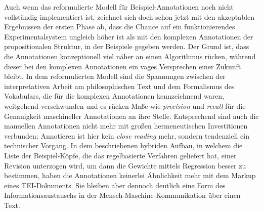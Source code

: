\documentclass{article}
\newcommand*{\englisch}[1]{\foreignlanguage{english}{\textit{#1}}}%
\begin{document}
Auch wenn das reformulierte Modell für Beispiel-Annotationen noch
nicht vollständig implementiert ist, zeichnet sich doch schon jetzt
mit den akzeptablen Ergebnissen der ersten Phase ab, dass die Chance
auf ein funktionierendes Experimentalsystem ungleich höher ist als mit
den komplexen Annotationen der propositionalen Struktur, in der
Beispiele gegeben werden. Der Grund ist, dass die Annotationen
konzeptionell viel näher an einen Algorithmus rücken, während dieser
bei den komplexen Annotationen ein vages Versprechen einer Zukunft
bleibt. In dem reformulierten Modell sind die Spannungen zwischen der
interpretativen Arbeit am philosophischen Text und dem Formalismus des
Vokabulars, die für die komplexen Annotationen kennzeichnend waren,
weitgehend verschwunden und es rücken Maße wie \englisch{precision}
und \englisch{recall} für die Genauigkeit maschineller Annotationen an
ihre Stelle. Entsprechend sind auch die manuellen Annotationen nicht
mehr mit großen hermeneutischen Investitionen verbunden; Annotieren
ist hier kein \englisch{close reading} mehr, sondern tendenziell ein
technischer Vorgang. In dem beschriebenen hybriden Aufbau, in welchem
die Liste der Beispiel-Köpfe, die das regelbasierte Verfahren
geliefert hat, einer Revision unterzogen wird, um dann die Gewichte
mittels Regression besser zu bestimmen, haben die Annotationen
keinerlei Ähnlichkeit mehr mit dem Markup eines TEI-Dokuments. Sie
bleiben aber dennoch deutlich eine Form des Informationsaustauschs in
der Mensch-Maschine-Kommunikation über einen Text.


\printbibliography



\end{document}

